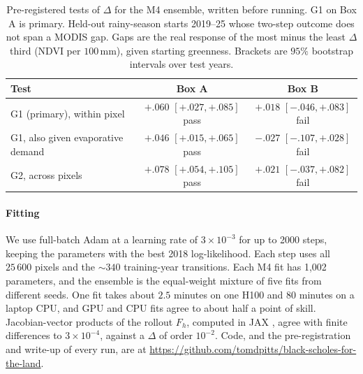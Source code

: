 \documentclass[letterpaper]{article} %
\begin{document}
\begin{table}[t]\centering\small
\begin{tabular}{lcc}\toprule
Test & Box A & Box B\\\midrule
G1 (primary), within pixel & $+.060$ $[+.027, +.085]$ pass & $+.018$ $[-.046, +.083]$ fail\\
G1, also given evaporative demand & $+.046$ $[+.015, +.065]$ pass & $-.027$ $[-.107, +.028]$ fail\\
G2, across pixels & $+.078$ $[+.054, +.105]$ pass & $+.021$ $[-.037, +.082]$ fail\\\bottomrule
\end{tabular}
\caption{Pre-registered tests of $\Delta$ for the M4 ensemble, written before running. G1 on Box A is primary. Held-out rainy-season starts 2019--25 whose two-step outcome does not span a MODIS gap. Gaps are the real response of the most minus the least $\Delta$ third (NDVI per $100$\,mm), given starting greenness. Brackets are $95\%$ bootstrap intervals over test years.}\label{tab:greekstests}
\end{table}


\paragraph{Fitting} We use full-batch Adam \citep{kingma2015} at a learning rate of $3\times10^{-3}$ for up to 2000 steps, keeping the parameters with the best 2018 log-likelihood. Each step uses all $25\,600$ pixels and the $\sim340$ training-year transitions. Each M4 fit has 1,002 parameters, and the ensemble is the equal-weight mixture of five fits from different seeds. One fit takes about $2.5$ minutes on one H100 and $80$ minutes on a laptop CPU, and GPU and CPU fits agree to about half a point of skill. Jacobian-vector products of the rollout $F_h$, computed in JAX \citep{jax2018}, agree with finite differences to $3\times10^{-4}$, against a $\Delta$ of order $10^{-2}$. Code, and the pre-registration and write-up of every run, are at \url{https://github.com/tomdpitts/black-scholes-for-the-land}.

\end{document}
